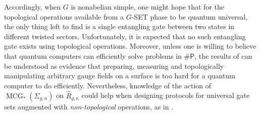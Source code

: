 \documentclass[10pt,twocolumn,amsmath,amssymb,aps,pra,secnumarabic,
    nofootinbib,groupedaddress]{revtex4-1}
\newcommand{\shP}{\mathsf{\#P}}
\newcommand{\MCG}{\operatorname{MCG}}
\newcommand{\hR}{\hat{R}}
\begin{document}
Accordingly, when $G$ is nonabelian simple, one might hope that for the topological operations available from a $G$-SET phase to be quantum universal, the only thing left to find is a single entangling gate between two states in different twisted sectors.  Unfortunately, it is expected that no such entangling gate exists using topological operations.  Moreover, unless one is willing to believe that quantum computers can efficiently solve problems in $\shP$, the results of \cite{KuperbergSamperton:zombies, KuperbergSamperton:coloring} can be understood as evidence that preparing, measuring and topologically manipulating arbitrary gauge fields on a surface is too hard for a quantum computer to do efficiently.  Nevertheless, knowledge of the action of $\MCG_*(\Sigma_{g,n})$ on $\hR_{g,n}$ could help when designing protocols for universal gate sets augmented with \emph{non-topological} operations, as in \cite{DelaneyWang:defects}.
\end{document}
